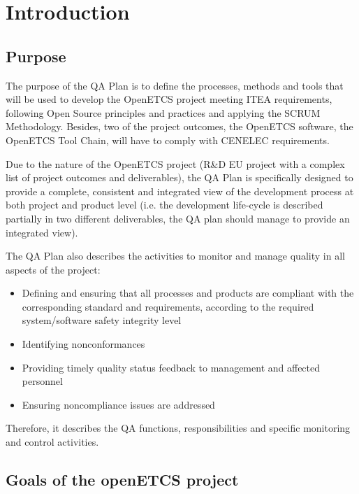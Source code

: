 \documentclass{template/openetcs_article}
\begin{document}
\newpage



\section[Introduction]{Introduction}


\subsection{Purpose}

The purpose of the QA Plan is to define the processes, methods and tools that will be used to develop the OpenETCS project meeting ITEA requirements, following Open Source principles and practices and applying the SCRUM Methodology. Besides, two of the project outcomes, the OpenETCS software, the OpenETCS Tool Chain, will have to comply with CENELEC requirements.

Due to the nature of the OpenETCS project (R\&D EU project with a complex list of project outcomes and deliverables), the QA Plan is specifically designed to provide a complete, consistent and integrated view of the development process at both project and product level (i.e. the development life-cycle is described partially in two different deliverables, the QA plan should manage to provide an integrated view).

The QA Plan also describes the activities to monitor and manage quality in all aspects of the project:

\begin{itemize}
\item Defining and ensuring that all processes and products are compliant with the corresponding standard and requirements, according to the required system/software safety integrity level
\item Identifying nonconformances
\item Providing timely quality status feedback to management and affected personnel
\item Ensuring noncompliance issues are addressed
\end{itemize}

Therefore, it describes the QA functions, responsibilities and specific monitoring and control activities.


\subsection{Goals of the openETCS project}
\end{document}

